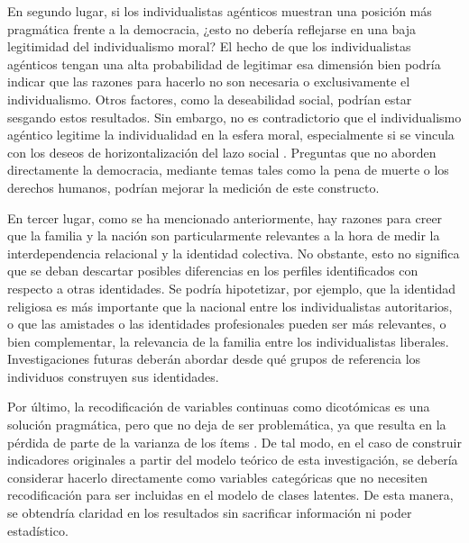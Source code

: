 \documentclass[12pt,twoside]{templates/facsothesis}
\begin{document}
En segundo lugar, si los individualistas agénticos muestran una posición más pragmática frente a la democracia, ¿esto no debería reflejarse en una baja legitimidad del individualismo moral? El hecho de que los individualistas agénticos tengan una alta probabilidad de legitimar esa dimensión bien podría indicar que las razones para hacerlo no son necesaria o exclusivamente el individualismo. Otros factores, como la deseabilidad social, podrían estar sesgando estos resultados. Sin embargo, no es contradictorio que el individualismo agéntico legitime la individualidad en la esfera moral, especialmente si se vincula con los deseos de horizontalización del lazo social \citep{araujo2020a}. Preguntas que no aborden directamente la democracia, mediante temas tales como la pena de muerte o los derechos humanos, podrían mejorar la medición de este constructo.

En tercer lugar, como se ha mencionado anteriormente, hay razones para creer que la familia y la nación son particularmente relevantes a la hora de medir la interdependencia relacional y la identidad colectiva. No obstante, esto no significa que se deban descartar posibles diferencias en los perfiles identificados con respecto a otras identidades. Se podría hipotetizar, por ejemplo, que la identidad religiosa es más importante que la nacional entre los individualistas autoritarios, o que las amistades o las identidades profesionales pueden ser más relevantes, o bien complementar, la relevancia de la familia entre los individualistas liberales. Investigaciones futuras deberán abordar desde qué grupos de referencia los individuos construyen sus identidades.

Por último, la recodificación de variables continuas como dicotómicas es una solución pragmática, pero que no deja de ser problemática, ya que resulta en la pérdida de parte de la varianza de los ítems \citep{fernandes2019}. De tal modo, en el caso de construir indicadores originales a partir del modelo teórico de esta investigación, se debería considerar hacerlo directamente como variables categóricas que no necesiten recodificación para ser incluidas en el modelo de clases latentes. De esta manera, se obtendría claridad en los resultados sin sacrificar información ni poder estadístico.
\end{document}
